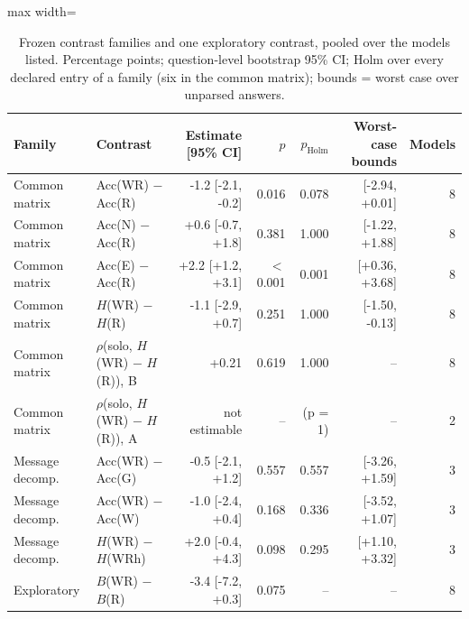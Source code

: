 \begin{table}[t]
\centering
\caption{Frozen contrast families and one exploratory contrast, pooled over the models listed. Percentage points; question-level bootstrap 95\% CI; Holm over every declared entry of a family (six in the common matrix); bounds = worst case over unparsed answers.}
\label{tab:contrasts}
\begin{adjustbox}{max width=\textwidth}
\small
\begin{tabular}{@{}llrrrrr@{}}
\toprule
Family & Contrast & Estimate [95\% CI] & $p$ & $p_{\text{Holm}}$ & Worst-case bounds & Models \\
\midrule
Common matrix & Acc(WR) $-$ Acc(R) & -1.2 [-2.1, -0.2] & 0.016 & 0.078 & [-2.94, +0.01] & 8 \\
Common matrix & Acc(N) $-$ Acc(R) & +0.6 [-0.7, +1.8] & 0.381 & 1.000 & [-1.22, +1.88] & 8 \\
Common matrix & Acc(E) $-$ Acc(R) & +2.2 [+1.2, +3.1] & $<$0.001 & 0.001 & [+0.36, +3.68] & 8 \\
Common matrix & $H$(WR) $-$ $H$(R) & -1.1 [-2.9, +0.7] & 0.251 & 1.000 & [-1.50, -0.13] & 8 \\
Common matrix & $\rho$(solo, $H$(WR) $-$ $H$(R)), B & +0.21 & 0.619 & 1.000 & -- & 8 \\
Common matrix & $\rho$(solo, $H$(WR) $-$ $H$(R)), A & not estimable & -- & (p = 1) & -- & 2 \\
\midrule
Message decomp. & Acc(WR) $-$ Acc(G) & -0.5 [-2.1, +1.2] & 0.557 & 0.557 & [-3.26, +1.59] & 3 \\
Message decomp. & Acc(WR) $-$ Acc(W) & -1.0 [-2.4, +0.4] & 0.168 & 0.336 & [-3.52, +1.07] & 3 \\
Message decomp. & $H$(WR) $-$ $H$(WRh) & +2.0 [-0.4, +4.3] & 0.098 & 0.295 & [+1.10, +3.32] & 3 \\
\midrule
Exploratory & $B$(WR) $-$ $B$(R) & -3.4 [-7.2, +0.3] & 0.075 & -- & -- & 8 \\
\bottomrule
\end{tabular}
\end{adjustbox}
\end{table}
